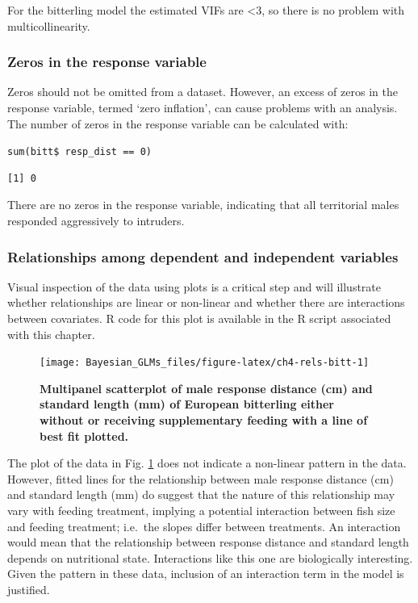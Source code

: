 \documentclass[
]{book}
\begin{document}
For the bitterling model the estimated VIFs are \textless3, so there is no problem with multicollinearity.

\hypertarget{zeros-in-the-response-variable}{%
\subsubsection{Zeros in the response variable}\label{zeros-in-the-response-variable}}

Zeros should not be omitted from a dataset. However, an excess of zeros in the response variable, termed `zero inflation', can cause problems with an analysis. The number of zeros in the response variable can be calculated with:

\texttt{sum(bitt\$\ resp\_dist\ ==\ 0)}

\begin{verbatim}
[1] 0
\end{verbatim}

There are no zeros in the response variable, indicating that all territorial males responded aggressively to intruders.

\hypertarget{relationships-among-dependent-and-independent-variables-1}{%
\subsubsection{Relationships among dependent and independent variables}\label{relationships-among-dependent-and-independent-variables-1}}

Visual inspection of the data using plots is a critical step and will illustrate whether relationships are linear or non-linear and whether there are interactions between covariates. R code for this plot is available in the R script associated with this chapter.



\begin{figure}

{\centering \texttt{[image: Bayesian\_GLMs\_files/figure-latex/ch4-rels-bitt-1]} 

}

\caption{\textbf{Multipanel scatterplot of male response distance (cm) and standard length (mm) of European bitterling either without or receiving supplementary feeding with a line of best fit plotted.}}\label{fig:ch4-rels-bitt}
\end{figure}

The plot of the data in Fig. \ref{fig:ch4-rels-bitt} does not indicate a non-linear pattern in the data. However, fitted lines for the relationship between male response distance (cm) and standard length (mm) do suggest that the nature of this relationship may vary with feeding treatment, implying a potential interaction between fish size and feeding treatment; i.e.~the slopes differ between treatments. An interaction would mean that the relationship between response distance and standard length depends on nutritional state. Interactions like this one are biologically interesting. Given the pattern in these data, inclusion of an interaction term in the model is justified.
\end{document}
